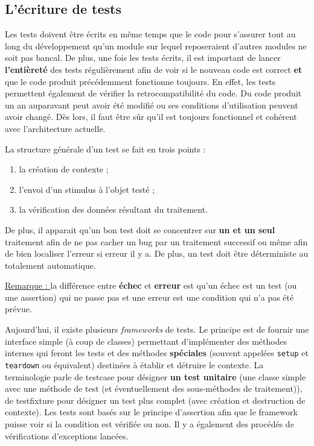 \documentclass{article}
\begin{document}
	\subsection{L'écriture de tests}
		Les tests doivent être écrits en même temps que le code pour s'assurer tout au long du développement qu'un module sur lequel reposeraient d'autres modules ne soit pas bancal. De plus, une
		fois les tests écrits, il est important de lancer \textbf{l'entièreté} des tests régulièrement afin de voir si le nouveau code est correct \textbf{et} que le code produit précédemment fonctionne
		toujours. En effet, les tests permettent également de vérifier la retrocompatibilité du code. Du code produit un an auparavant peut avoir été modifié ou ses conditions d'utilisation peuvent
		avoir changé. Dès lors, il faut être sûr qu'il est toujours fonctionnel et cohérent avec l'architecture actuelle.

		La structure générale d'un test se fait en trois points : 

		\begin{enumerate}
			\item la création de contexte ;
			\item l'envoi d'un stimulus à l'objet testé ;
			\item la vérification des données résultant du traitement.
		\end{enumerate}

		De plus, il apparait qu'un bon test doit se concentrer sur \textbf{un et un seul} traitement afin de ne pas cacher un bug par un traitement successif ou même afin de bien localiser l'erreur
		si erreur il y a. De plus, un test doit être déterministe au totalement automatique.

		\underline{Remarque : } la différence entre \textbf{échec} et \textbf{erreur} est qu'un échec est un test (ou une assertion) qui ne passe pas et une erreur est une condition qui n'a pas été
		prévue.

		Aujourd'hui, il existe plusieurs \textit{frameworks} de tests. Le principe est de fournir une interface simple (à coup de classes) permettant d'implémenter des méthodes internes qui feront les
		tests et des méthodes \textbf{spéciales} (souvent appelées \texttt{setup} et \texttt{teardown} ou équivalent) destinées à établir et détruire le contexte. La terminologie parle de testcase
		pour désigner \textbf{un test unitaire} (une classe simple avec une méthode de test (et éventuellement des sous-méthodes de traitement)), de testfixture pour désigner un test plus
		complet (avec création et destruction de contexte). Les tests sont basés sur le principe d'assertion afin que le framework puisse voir si la condition est vérifiée ou non. Il y a également
		des procédés de vérifications d'exceptions lancées.
	
\end{document}
